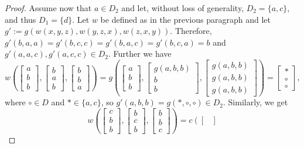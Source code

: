 \documentclass[11pt]{amsart}
\theoremstyle{definition}
\theoremstyle{remark}
\theoremstyle{plain}
\begin{document}
\begin{proof}
Assume now that $a\in D_2$ and let, without loss of generality, $D_2=\{a,c\}$, and thus $D_1=\{d\}$. Let $w$ be defined as in the previous paragraph and let $g':=g(w(x,y,z),w(y,z,x),w(z,x,y))$. Therefore, $g'(b,a,a)=g'(b,c,c)=g'(b,a,c)=g'(b,c,a)=b$ and $g'(a,a,c),g'(a,c,c)\in D_2$. Further we have
$$
w\left(
\begin{bmatrix}
a \\
b \\
b
\end{bmatrix}\!,\!
\begin{bmatrix}
b \\
a \\
b
\end{bmatrix}\!,\!
\begin{bmatrix}
b \\
b \\
a
\end{bmatrix}
\right)=g\left(
\begin{bmatrix}
a \\
b \\
b
\end{bmatrix}\!,\!
\begin{bmatrix}
g(a,b,b) \\
b \\
b
\end{bmatrix}\!,\!
\begin{bmatrix}
g(a,b,b) \\
g(a,b,b) \\
g(a,b,b)
\end{bmatrix}
\right)=
\begin{bmatrix}
\ast \\
\circ \\
\circ
\end{bmatrix},
$$
where $\circ\in D$ and $\ast\in\{a,c\}$, so $g'(a,b,b)=g(\ast,\circ,\circ)\in D_2$. Similarly, we get
$$
w\left(
\begin{bmatrix}
c \\
b \\
b
\end{bmatrix}\!,\!
\begin{bmatrix}
b \\
c \\
b
\end{bmatrix}\!,\!
\begin{bmatrix}
b \\
b \\
c
\end{bmatrix}
\right)=c\left(
\begin{bmatrix}

\end{bmatrix}$$
\end{proof}
\end{document}
